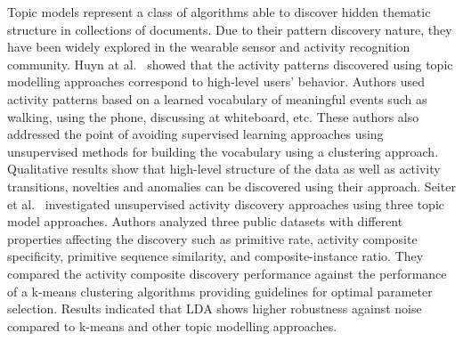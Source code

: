 Topic models represent a class of algorithms able to discover hidden thematic structure in collections of documents. Due to their pattern discovery nature, they have been widely explored in the wearable sensor and activity recognition community. 
Huyn at al.~\cite{Huynh_2008} showed that the activity patterns discovered using topic modelling approaches correspond to high-level users' behavior. Authors used activity patterns based on a learned vocabulary of meaningful events such as walking, using the phone, discussing at whiteboard, etc. These authors also addressed the point of avoiding supervised learning approaches using unsupervised methods for building the vocabulary using a clustering approach. Qualitative results show that high-level structure of the data as well as activity transitions, novelties and anomalies can be discovered using their approach.
Seiter et al.~\cite{Seiter_2014} investigated unsupervised activity discovery approaches using three topic model approaches. Authors analyzed three public datasets with different properties affecting the discovery such as primitive rate, activity composite specificity, primitive sequence similarity, and composite-instance ratio. They compared the activity composite discovery performance against the performance of a k-means clustering algorithms providing guidelines for optimal parameter selection. Results indicated that LDA shows higher robustness against noise compared to k-means and other topic modelling approaches. 
